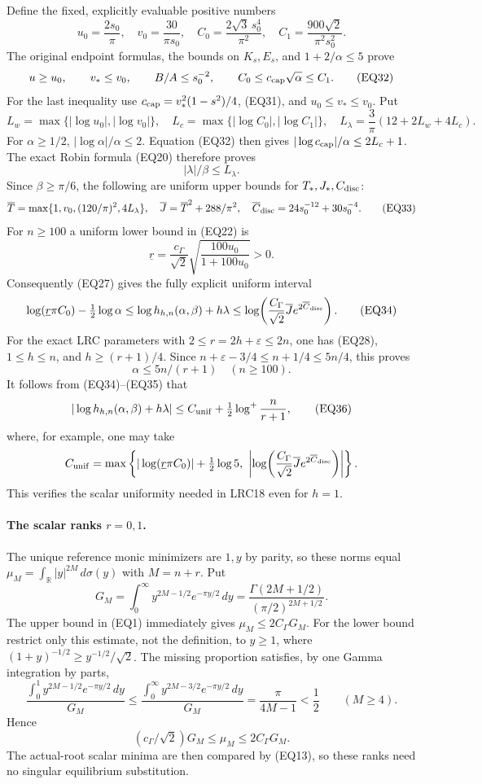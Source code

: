 \documentclass[11pt,a4paper]{article}
\begin{document}
Define the fixed, explicitly evaluable positive numbers
\[
 u_0=\frac{2s_0}{\pi},\quad v_0=\frac{30}{\pi s_0},\quad
 C_0=\frac{2\sqrt3\,s_0^4}{\pi^2},\quad
 C_1=\frac{900\sqrt2}{\pi^2s_0^2}.
\]
The original endpoint formulas, the bounds on \(K_s,E_s\), and
\(1+2/\alpha\le5\) prove
\[
 u\ge u_0,\qquad v_*\le v_0,\qquad
 B/A\le s_0^{-2},\qquad
 C_0\le c_{\rm cap}\sqrt\alpha\le C_1 .
\tag{EQ32}
\]
For the last inequality use
\(c_{\rm cap}=v_*^2(1-s^2)/4\), (EQ31), and
\(u_0\le v_*\le v_0\).
Put
\[
 L_w=\max\{|\log u_0|,|\log v_0|\},\quad
 L_c=\max\{|\log C_0|,|\log C_1|\},\quad
 L_\lambda=\frac3\pi(12+2L_w+4L_c).
\]
For \(\alpha\ge1/2\),
\(|\log\alpha|/\alpha\le2\).  Equation (EQ32) then gives
\(|\log c_{\rm cap}|/\alpha\le2L_c+1\).
The exact Robin formula (EQ20) therefore proves
\[
 |\lambda|/\beta\le L_\lambda.
\]
Since \(\beta\ge\pi/6\), the following are uniform upper bounds for
\(T_*,J_*,C_{\rm disc}\):
\[
 \overline T=\max\{1,v_0,(120/\pi)^2,4L_\lambda\},\quad
 \overline J=\overline T^2+288/\pi^2,\quad
 \overline C_{\rm disc}=24s_0^{-12}+30s_0^{-4}.
\tag{EQ33}
\]
For \(n\ge100\) a uniform lower bound in (EQ22) is
\[
 \underline r=\frac{c_\Gamma}{\sqrt2}
             \sqrt{\frac{100u_0}{1+100u_0}}>0.
\]
Consequently (EQ27) gives the fully explicit uniform interval
\[
 \log(\underline r\pi C_0)-\tfrac12\log\alpha
 \le\log h_{h,n}(\alpha,\beta)+h\lambda
 \le\log\!\left(
      \frac{C_\Gamma}{\sqrt2}\overline J
      e^{2\overline C_{\rm disc}}\right).
\tag{EQ34}
\]
For the exact LRC parameters with \(2\le r=2h+\varepsilon\le2n\),
one has (EQ28), \(1\le h\le n\), and \(h\ge(r+1)/4\).
Since \(n+\varepsilon-3/4\le n+1/4\le5n/4\), this proves
\[
 \alpha\le5n/(r+1)\quad(n\ge100).
\tag{EQ35}
\]
It follows from (EQ34)--(EQ35) that
\[
 |\log h_{h,n}(\alpha,\beta)+h\lambda|
 \le C_{\rm unif}+\tfrac12\log^+\frac{n}{r+1},
\tag{EQ36}
\]
where, for example, one may take
\[
 C_{\rm unif}=\max\left\{
 |\log(\underline r\pi C_0)|+\tfrac12\log5,\
 \left|\log\!\left(\frac{C_\Gamma}{\sqrt2}\overline J
               e^{2\overline C_{\rm disc}}\right)\right|
 \right\}.
\]
This verifies the scalar uniformity needed in LRC18 even for \(h=1\).

\paragraph{The scalar ranks \(r=0,1\).}
The unique reference monic minimizers are \(1,y\) by parity, so these
norms equal \(\mu_M=\int_{\mathbb R}|y|^{2M}\,d\sigma(y)\) with
\(M=n+r\).  Put
\[
 G_M=\int_0^\infty y^{2M-1/2}e^{-\pi y/2}\,dy
     =\frac{\Gamma(2M+1/2)}{(\pi/2)^{2M+1/2}}.
\]
The upper bound in (EQ1) immediately gives \(\mu_M\le2C_\Gamma G_M\).
For the lower bound restrict only this estimate, not the definition,
to \(y\ge1\), where
\((1+y)^{-1/2}\ge y^{-1/2}/\sqrt2\).
The missing proportion satisfies, by one Gamma integration by parts,
\[
 \frac{\int_0^1 y^{2M-1/2}e^{-\pi y/2}\,dy}{G_M}
 \le \frac{\int_0^\infty y^{2M-3/2}e^{-\pi y/2}\,dy}{G_M}
 =\frac{\pi}{4M-1}<\frac12\qquad(M\ge4).
\]
Hence
\[
 (c_\Gamma/\sqrt2)G_M\le\mu_M\le2C_\Gamma G_M.
\tag{EQ37}
\]
The actual-root scalar minima are then compared by (EQ13), so these
ranks need no singular equilibrium substitution.
\end{document}
